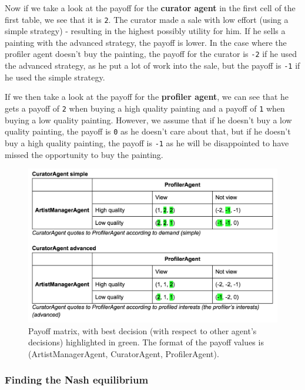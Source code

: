 \documentclass[a4paper, 11pt]{article}
\begin{document}
Now if we take a look at the payoff for the \textbf{curator agent} in the first cell of the first table, we see that it is \texttt{2}. The curator made a sale with low effort (using a simple strategy) - resulting in the highest possibly utility for him. If he sells a painting with the advanced strategy, the payoff is lower. In the case where the profiler agent doesn't buy the painting, the payoff for the curator is \texttt{-2} if he used the advanced strategy, as he put a lot of work into the sale, but the payoff is \texttt{-1} if he used the simple strategy.

If we then take a look at the payoff for the \textbf{profiler agent}, we can see that he gets a payoff of \texttt{2} when buying a high quality painting and a payoff of \texttt{1} when buying a low quality painting. However, we assume that if he doesn't buy a low quality painting, the payoff is \texttt{0} as he doesn't care about that, but if he doesn't buy a high quality painting, the payoff is \texttt{-1} as he will be disappointed to have missed the opportunity to buy the painting.


\begin{figure}[h]
    \centering
    \includegraphics[width=1.0\linewidth]{payoff_matrices.png}
    \caption{Payoff matrix, with best decision (with respect to other agent's decisions) highlighted in green. The format of the payoff values is (ArtistManagerAgent, CuratorAgent, ProfilerAgent).}
    \label{fig:payoff_matrices}
\end{figure}

\subsubsection{Finding the Nash equilibrium}
\end{document}
